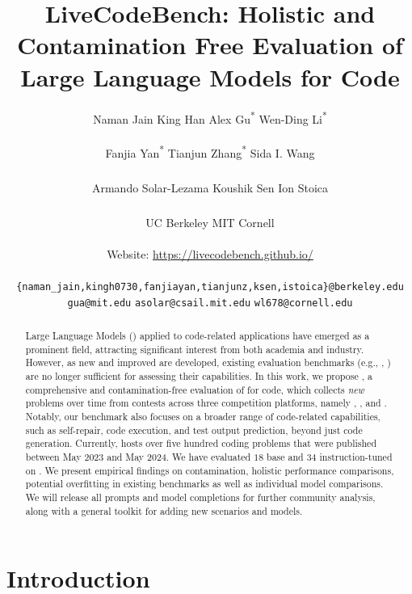 \documentclass[letterpaper,11pt]{article}
\title{LiveCodeBench: Holistic and Contamination Free Evaluation of Large Language Models for Code}
\author{Naman Jain\textsuperscript{\textdagger} \quad \quad 
King Han\textsuperscript{\textdagger} \quad \quad 
Alex Gu\textsuperscript{*} \textsuperscript{\textdollar} \quad \quad 
Wen-Ding Li\textsuperscript{*}\textsuperscript{\textdaggerdbl} \quad  \\ \\
Fanjia Yan\textsuperscript{*}\textsuperscript{\textdagger} \quad \quad 
Tianjun Zhang\textsuperscript{*}\textsuperscript{\textdagger} 
\quad \quad 
Sida I. Wang%
\quad \\ \\
Armando Solar-Lezama\textsuperscript{\textdollar} \quad \quad 
Koushik Sen\textsuperscript{\textdagger} \quad \quad 
Ion Stoica\textsuperscript{\textdagger} \\
{ }\\
\textsuperscript{\textdagger} UC Berkeley \quad \textsuperscript{\textdollar} MIT \quad \textsuperscript{\textdaggerdbl} Cornell 
\\
{ }\\
Website: \url{https://livecodebench.github.io/} \\
{ }\\
\texttt{\{naman\_jain,kingh0730,fanjiayan,tianjunz,ksen,istoica\}@berkeley.edu}\\
\texttt{gua@mit.edu} \quad \quad \texttt{asolar@csail.mit.edu} \quad \quad \texttt{wl678@cornell.edu} \quad %
}
\date{} %
\begin{document}

\maketitle

\noindent %
\begin{abstract}
\noindent Large Language Models (\llms{}) applied to code-related applications have emerged as a prominent field, attracting significant interest from both academia and industry. 
However, as new and improved \llms{} are developed, existing evaluation benchmarks (e.g., \humaneval{}, \mbpp{}) are no longer sufficient for assessing their capabilities.
In this work, we propose \livecodebench{}, a comprehensive and contamination-free evaluation of \llms{} for code, which collects \textit{new} problems over time from contests across three competition platforms, namely \leetcode{}, \atcoder{}, and \codeforces{}.
Notably, our benchmark also focuses on a broader range of code-related capabilities, such as self-repair, code execution, and test output prediction, beyond just code generation.
Currently, \livecodebench{} hosts over five hundred coding problems that were published between May 2023 and May 2024.
We have evaluated $18$ base \llms{} and $34$ instruction-tuned \llms{} on \livecodebench{}.
We present empirical findings on contamination, holistic performance comparisons, potential overfitting in existing benchmarks as well as individual model comparisons.
We will release all prompts and model completions for further community analysis, along with a general toolkit for adding new scenarios and models.%
\end{abstract}

\clearpage
\renewcommand{\baselinestretch}{1.2}\normalsize 
{}
{}
\renewcommand{\baselinestretch}{1.0}\normalsize 
\clearpage

\section{Introduction}
\label{sec:introduction}

\end{document}
